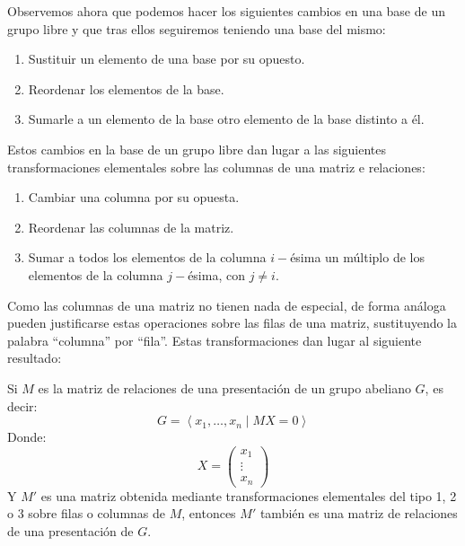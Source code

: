 \noindent
Observemos ahora que podemos hacer los siguientes cambios en una base de un grupo libre y que tras ellos seguiremos teniendo una base del mismo:
\begin{enumerate}
    \item Sustituir un elemento de una base por su opuesto.
    \item Reordenar los elementos de la base.
    \item Sumarle a un elemento de la base otro elemento de la base distinto a él.
\end{enumerate}
Estos cambios en la base de un grupo libre dan lugar a las siguientes transformaciones elementales sobre las columnas de una matriz e relaciones:
\begin{enumerate}
    \item Cambiar una columna por su opuesta.
    \item Reordenar las columnas de la matriz.
    \item Sumar a todos los elementos de la columna $i-$ésima un múltiplo de los elementos de la columna $j-$ésima, con $j\neq i$.
\end{enumerate}
Como las columnas de una matriz no tienen nada de especial, de forma análoga pueden justificarse estas operaciones sobre las filas de una matriz, sustituyendo la palabra ``columna'' por ``fila''. Estas transformaciones dan lugar al siguiente resultado:

\begin{prop}
    Si $M$ es la matriz de relaciones de una presentación de un grupo abeliano $G$, es decir:
    \begin{equation*}
        G = \left\langle x_1,\ldots,x_n \mid MX = 0  \right\rangle 
    \end{equation*}
    Donde:
    \begin{equation*}
        X = \left(\begin{array}{c}
            x_1 \\
            \vdots \\
            x_n
        \end{array}\right)
    \end{equation*}
    Y $M'$ es una matriz obtenida mediante transformaciones elementales del tipo 1, 2 o 3 sobre filas o columnas de $M$, entonces $M'$ también es una matriz de relaciones de una presentación de $G$.
\end{prop}

